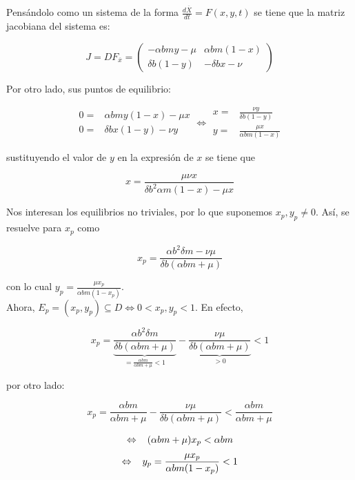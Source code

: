 \documentclass[10pt,oneside]{article}
\theoremstyle{definition}
\begin{document}
\begin{multicols}{2}
    Pensándolo como un sistema de la forma $\frac{d\overline{X}}{dt}=F(x,y,t)$ se tiene que la matriz jacobiana del sistema es:
    
    $$J=DF_{\overline{x}}=\left(\begin{array}{cc}
        -\alpha bmy-\mu & \alpha bm(1-x) \\
         \delta b(1-y)  & -\delta bx-\nu
    \end{array}\right)$$

    Por otro lado, sus puntos de equilibrio:

    $$\begin{array}{rl}
         0=&\alpha bm y(1-x)-\mu x \\
         0=&\delta b x(1-y)-\nu y
    \end{array} \Leftrightarrow \begin{array}{rl}
        x=& \displaystyle{\frac{\nu y}{\delta b(1-y)}} \\
        y=& \displaystyle{\frac{\mu x}{\alpha bm(1-x)}}
    \end{array}$$

    sustituyendo el valor de $y$ en la expresión de $x$ se tiene que 
    
    $$x=\frac{\mu\nu x}{\delta b^2\alpha m(1-x)-\mu x}$$
    
    Nos interesan los equilibrios no triviales, por lo que suponemos $x_p,y_p\neq0$. Así, se resuelve para $x_p$ como 
    
    $$x_p=\frac{\alpha b^2\delta m -\nu\mu}{\delta b(\alpha bm+\mu)}$$
    
    con lo cual $y_p=\displaystyle{\frac{\mu x_p}{\alpha bm(1-x_p)}}$.\\ \newline Ahora, $E_p=(x_p,y_p)\subseteq D \Leftrightarrow 0< x_p,y_p< 1$. En efecto, 

    $$x_p=\underbrace{\frac{\alpha b^2\delta m}{\delta b(\alpha bm+\mu)}}_{=\frac{\alpha bm}{\alpha bm+\mu}<1}-\underbrace{\frac{\nu\mu}{\delta b(\alpha bm+\mu)}}_{>0}<1$$

    por otro lado:

    $$x_p=\frac{\alpha b m}{\alpha bm+\mu}-\frac{\nu\mu}{\delta b(\alpha bm+\mu)}<\frac{\alpha b m}{\alpha bm+\mu}$$

    $$\Leftrightarrow\hspace{0.3cm} (\alpha bm+\mu)x_p<\alpha bm$$
    $$\Leftrightarrow\hspace{0.3cm} y_p=\frac{\mu x_p}{\alpha bm(1-x_p)}<1$$


\end{multicols}
\end{document}
